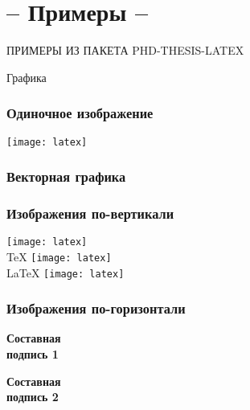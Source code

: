 \section{-- Примеры --}
\begin{frame}
    \begin{center}
        \Huge
        ПРИМЕРЫ ИЗ ПАКЕТА PHD-THESIS-LATEX
    \end{center}
\end{frame}
\begin{frame}
    \begin{center}
        \Huge
        Графика
    \end{center}
\end{frame}


\begin{frame}
    \frametitle{Одиночное изображение}
    \centering
    \texttt{[image: latex]} %
\end{frame}

\begin{frame}
    \frametitle{Векторная графика}
    \begin{figure}
	    \centering
	    
    \end{figure}
\end{frame}


\begin{frame}
    \frametitle{Изображения по-вертикали}
    \centering
    \vfill
    \texttt{[image: latex]} \\
    \TeX
    \vfill
    \texttt{[image: latex]} \\
    \LaTeX
    \vfill
    \texttt{[image: latex]} \\
    \vfill
\end{frame}


\begin{frame}
    \frametitle{Изображения по-горизонтали}
    \begin{minipage}[t]{0.47\linewidth}
        \textbf{Составная \\ подпись 1}
    \end{minipage}
    \hfill
    \begin{minipage}[t]{0.47\linewidth}
        \textbf{Составная \\ подпись 2}
    \end{minipage}
\end{frame}

